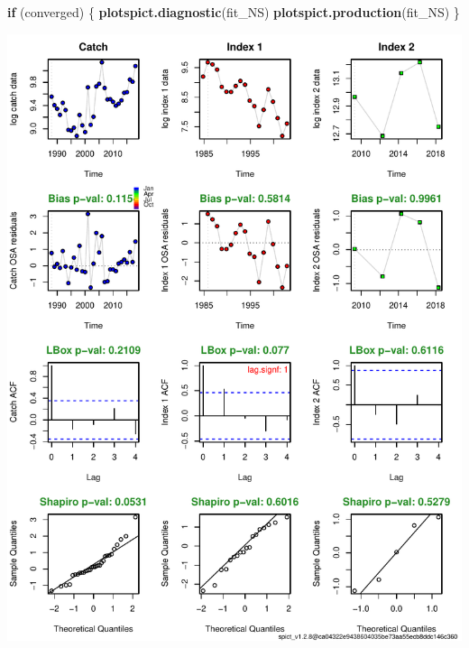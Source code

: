\documentclass[
]{article}
\newenvironment{Shaded}{\begin{snugshade}}{\end{snugshade}}
\newcommand{\ControlFlowTok}[1]{\textcolor[rgb]{0.13,0.29,0.53}{\textbf{#1}}}
\newcommand{\KeywordTok}[1]{\textcolor[rgb]{0.13,0.29,0.53}{\textbf{#1}}}
\newcommand{\NormalTok}[1]{#1}
\begin{document}
\begin{Shaded}
\begin{Highlighting}[]
\ControlFlowTok{if}\NormalTok{ (converged) \{}
  \KeywordTok{plotspict.diagnostic}\NormalTok{(fit_NS)}
  \KeywordTok{plotspict.production}\NormalTok{(fit_NS)}
\NormalTok{\}}
\end{Highlighting}
\end{Shaded}

\includegraphics{aru.27.123a4_SPiCT_WD_files/figure-latex/diagnostics_scenario_2-1.pdf}
\end{document}
